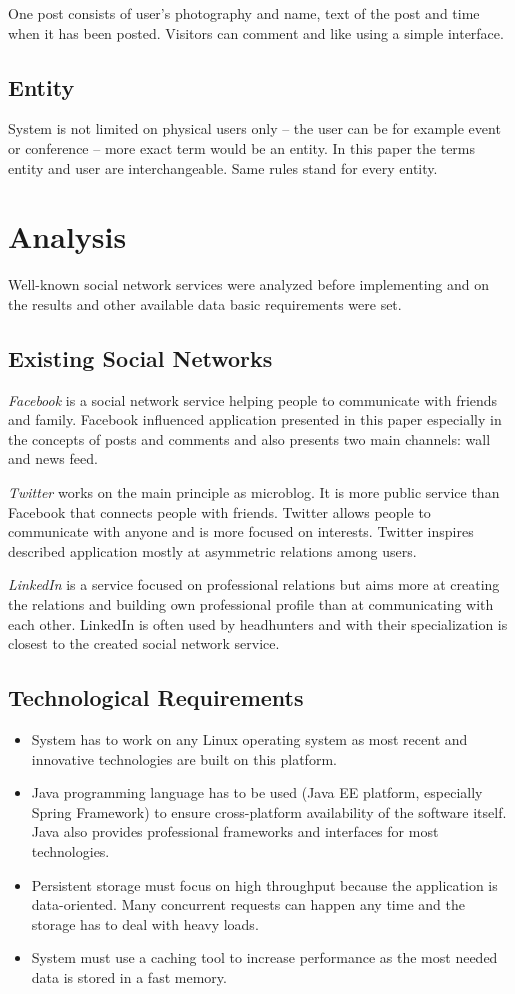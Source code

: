 \documentclass{llncs}
\begin{document}
One post consists of user's photography and name, text of the post and time
when it has been posted. Visitors can comment and like using a simple
interface.

\subsection{Entity}
System is not limited on physical users only – the user can be for example
event or conference – more exact term would be an entity. In this paper the
terms entity and user are interchangeable. Same rules stand for every entity.

\section{Analysis}
Well-known social network services were analyzed before implementing and on
the results and other available data basic requirements were set.

\subsection{Existing Social Networks}
\emph{Facebook} is a social network service helping people to communicate with
friends and family. Facebook influenced application presented in this paper
especially in the concepts of posts and comments and also presents two main
channels: wall and news feed.

\emph{Twitter} works on the main principle as microblog. It is more public
service than Facebook that connects people with friends. Twitter allows people
to communicate with anyone and is more focused on interests. Twitter inspires
described application mostly at asymmetric relations among users.

\emph{LinkedIn} is a service focused on professional relations but aims more
at creating the relations and building own professional profile than at
communicating with each other. LinkedIn is often used by headhunters and with
their specialization is closest to the created social network service.

\subsection{Technological Requirements}
\begin{itemize}
\item System has to work on any Linux operating system as most recent and
innovative technologies are built on this platform.
\item Java programming language has to be used (Java EE platform, especially
Spring Framework) to ensure cross-platform availability of the software
itself. Java also provides professional frameworks and interfaces for most
technologies.
\item Persistent storage must focus on high throughput because the application
is data-oriented. Many concurrent requests can happen any time and the storage
has to deal with heavy loads.
\item System must use a caching tool to increase performance as the most
needed data is stored in a fast memory.
\end{itemize}
\end{document}
